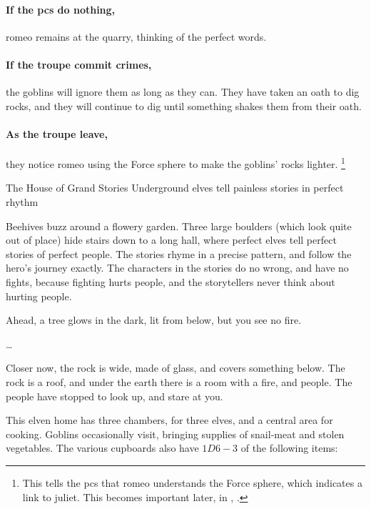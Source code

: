\begin{multicols}{2}
\paragraph{If the \glspl{pc} do nothing,}
\gls{romeo} remains at the quarry, thinking of the perfect words.

\paragraph{If the troupe commit crimes,}
the goblins will ignore them as long as they can.
They have taken an oath to dig rocks, and they will continue to dig until something shakes them from their oath.

\romeo

\showStdSpells

\paragraph{As the troupe leave,}
they notice \gls{romeo} using the Force \gls{sphere} to make the goblins' rocks lighter.%
\footnote{This tells the \glspl{pc} that \gls{romeo} understands the Force \gls{sphere}, which indicates a link to \gls{juliet}.
This becomes important later, in , .}

{The House of Grand Stories}%
{Underground elves tell painless stories in perfect rhythm}%

Beehives buzz around a flowery garden.
Three large boulders (which look quite out of place) hide stairs down to a long hall, where perfect elves tell perfect stories of perfect people.
The stories rhyme in a precise pattern, and follow the hero's journey exactly.
The characters in the stories do no wrong, and have no fights, because fighting hurts people, and the storytellers never think about hurting people.

\begin{boxtext}
  Ahead, a tree glows in the dark, lit from below, but you see no fire.

  \ldots

  Closer now, the rock is  wide, made of glass, and covers something below.
  The rock is a roof, and under the earth there is a room with a fire, and people.
  The people have stopped to look up, and stare at you.
\end{boxtext}

This elven home has three chambers, for three elves, and a central area for cooking.
Goblins occasionally visit, bringing supplies of snail-meat and stolen vegetables.
The various cupboards also have $1D6-3$ of the following items:


\end{multicols}
